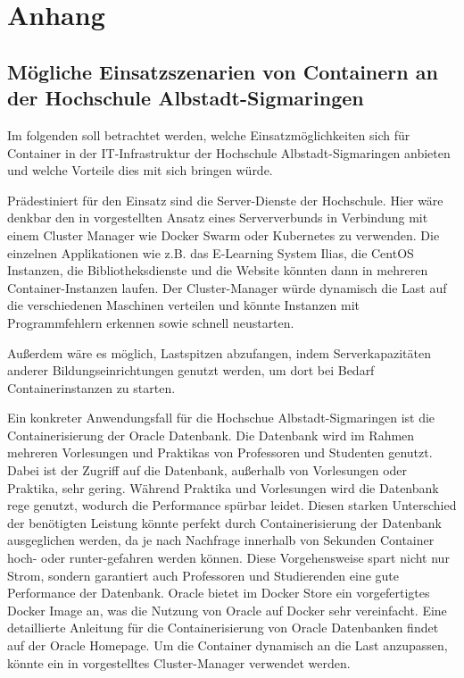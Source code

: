 \section{Anhang}
\label{sec:anhang}

\subsection{Mögliche Einsatzszenarien von Containern an der Hochschule Albstadt-Sigmaringen}
\label{app:EinsatzHSAlbSig}

Im folgenden soll betrachtet werden, welche Einsatzmöglichkeiten sich für Container in der IT-Infrastruktur der Hochschule Albstadt-Sigmaringen anbieten und welche Vorteile dies mit sich bringen würde. 

Prädestiniert für den Einsatz sind die Server-Dienste der Hochschule.
Hier wäre denkbar den in  vorgestellten Ansatz eines Serververbunds in Verbindung mit einem Cluster Manager wie Docker Swarm oder Kubernetes zu verwenden.
Die einzelnen Applikationen wie z.B. das E-Learning System Ilias, die CentOS Instanzen, die Bibliotheksdienste und die Website könnten dann in mehreren Container-Instanzen laufen.
Der Cluster-Manager würde dynamisch die Last auf die verschiedenen Maschinen verteilen und könnte Instanzen mit Programmfehlern erkennen sowie schnell neustarten.

Außerdem wäre es möglich, Lastspitzen abzufangen, indem Serverkapazitäten anderer Bildungseinrichtungen genutzt werden, um dort bei Bedarf Containerinstanzen zu starten.

Ein konkreter Anwendungsfall für die Hochschue Albstadt-Sigmaringen ist die Containerisierung der Oracle Datenbank. Die Datenbank wird im Rahmen mehreren Vorlesungen und Praktikas von Professoren und Studenten genutzt. Dabei ist der Zugriff auf die Datenbank, außerhalb von Vorlesungen oder Praktika, sehr gering. Während Praktika und Vorlesungen wird die Datenbank rege genutzt, wodurch die Performance spürbar leidet. Diesen starken Unterschied der benötigten Leistung könnte perfekt durch Containerisierung der Datenbank ausgeglichen werden, da je nach Nachfrage innerhalb von Sekunden Container hoch- oder runter-gefahren werden können. Diese Vorgehensweise spart nicht nur Strom, sondern garantiert auch Professoren und Studierenden eine gute Performance der Datenbank. Oracle bietet im Docker Store ein vorgefertigtes Docker Image an, was die Nutzung von Oracle auf Docker sehr vereinfacht. Eine detaillierte Anleitung für die Containerisierung von Oracle Datenbanken findet auf der Oracle Homepage. Um die Container dynamisch an die Last anzupassen, könnte ein in  vorgestelltes Cluster-Manager verwendet werden.

